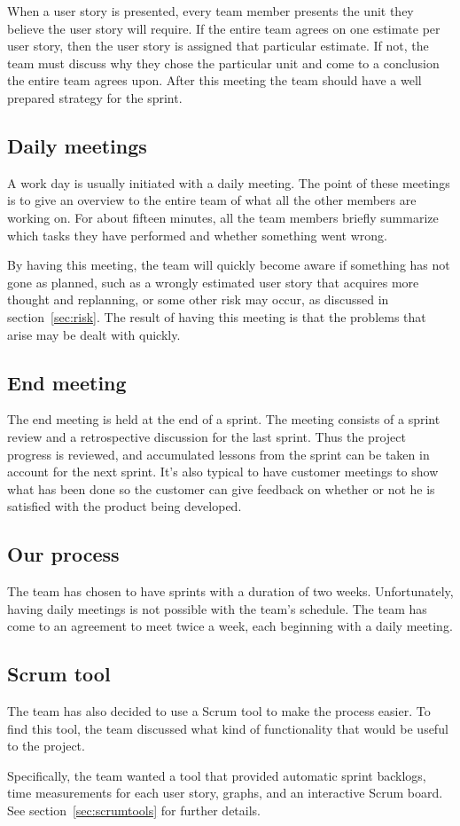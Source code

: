 When a user story is presented, every team member presents the unit they believe the user story will require. If the entire team agrees on one estimate per user story, then the user story is assigned that particular estimate. If not, the team must discuss why they chose the particular unit and come to a conclusion the entire team agrees upon.
After this meeting the team should have a well prepared strategy for the sprint.

\subsection{Daily meetings}
A work day is usually initiated with a daily meeting. The point of these meetings is to give an overview to the entire team of what all the other members are working on. For about fifteen minutes, all the team members briefly summarize which tasks they have performed and whether something went wrong.

By having this meeting, the team will quickly become aware if something has not gone as planned, such as a wrongly estimated user story that acquires more thought and replanning, or some other risk may occur, as discussed in section~\ref{sec:risk}. The result of having this meeting is that the problems that arise may be dealt with quickly.

\subsection{End meeting}
The end meeting is held at the end of a sprint. The meeting consists of a sprint review and a retrospective discussion for the last sprint.
Thus the project progress is reviewed, and accumulated lessons from the sprint can be taken in account for the next sprint.
It's also typical to have customer meetings to show what has been done so the customer can give feedback on 
whether or not he is satisfied with the product being developed.

\subsection{Our process}
The team has chosen to have sprints with a duration of two weeks. Unfortunately, having daily meetings is not possible with the team's schedule. The team has come to an agreement to meet twice a week, each beginning with a daily meeting.

\subsection{Scrum tool}
The team has also decided to use a Scrum tool to make the process easier.
To find this tool, the team discussed what kind of functionality that would be useful to the project.

Specifically, the team wanted a tool that provided automatic sprint backlogs, time measurements for each user story, graphs, and an interactive Scrum board. See section~\ref{sec:scrumtools} for further details.

